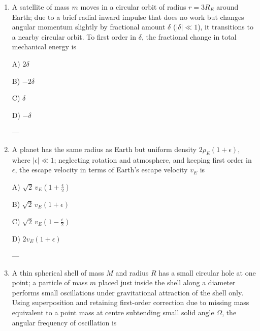 \documentclass[12pt]{article}
\begin{document}
\begin{enumerate}[leftmargin=*]
\begin{center}
\end{center}

A) \(\frac{2M}{2M+m}\omega\)  

B) \(\frac{M}{M+m}\omega\)  

C) \(\frac{2M+m}{2M+2m}\omega\)  

D) \(\frac{2M}{2M+3m}\omega\)  

---

\item A satellite of mass \(m\) moves in a circular orbit of radius \(r=3R_E\) around Earth; due to a brief radial inward impulse that does no work but changes angular momentum slightly by fractional amount \(\delta\) (\(|\delta|\ll1\)), it transitions to a nearby circular orbit. To first order in \(\delta\), the fractional change in total mechanical energy is  

A) \(2\delta\)  

B) \(-2\delta\)  

C) \(\delta\)  

D) \(-\delta\)  

---

\item A planet has the same radius as Earth but uniform density \(2\rho_E(1+\epsilon)\), where \(|\epsilon|\ll1\); neglecting rotation and atmosphere, and keeping first order in \(\epsilon\), the escape velocity in terms of Earth’s escape velocity \(v_E\) is  

A) \(\sqrt{2}\,v_E\left(1+\frac{\epsilon}{2}\right)\)  

B) \(\sqrt{2}\,v_E(1+\epsilon)\)  

C) \(\sqrt{2}\,v_E\left(1-\frac{\epsilon}{2}\right)\)  

D) \(2v_E(1+\epsilon)\)  

---

\item A thin spherical shell of mass \(M\) and radius \(R\) has a small circular hole at one point; a particle of mass \(m\) placed just inside the shell along a diameter performs small oscillations under gravitational attraction of the shell only. Using superposition and retaining first-order correction due to missing mass equivalent to a point mass at centre subtending small solid angle \(\Omega\), the angular frequency of oscillation is  


\end{enumerate}
\end{document}
